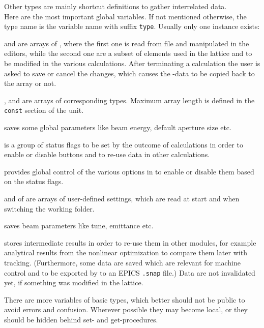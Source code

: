 \documentclass[12pt]{article}
\newcommand\code[1]{{\tt #1}}
\newcommand{\unico}[1]{{\color{burntorange}\code{#1}}}
\newcommand{\opagui}[1]{\colorbox{blue!20}{{\color{black}\code{#1}}}}
\newcommand{\ogui}[1]{\hyperref[#1]{\opagui{#1}}}
\newcommand{\todo}[1]{{\color{red} #1}}
\begin{document}
{Other types are mainly shortcut definitions to gather interrelated data.\\

Here are the most important global variables. If not mentioned otherwise, the type name is the variable name with suffix \code{type}. Usually only one instance exists:

\unico{Elem} and \unico{Ella} are arrays of \unico{Elementtype}, where the first one is read from file and manipulated in the editors, while the second one are a subset of elements used in the lattice and to be modified in the various calculations. After terminating a calculation the user is asked to save or cancel the changes, which causes the \unico{Ella}-data to be copied back to the \unico{Elem} array or not.

\unico{Segm}, \unico{Lattice} and \unico{Girder} are arrays of corresponding types. Maximum array length is defined in the \code{const} section of the unit.

\unico{Glob} saves some global parameters like beam energy, default aperture size etc.

\unico{Status} is a group of status flags to be set by the outcome of calculations in order to enable or disable buttons and to re-use data in other calculations.

\unico{MainButtonHandles} provides global control of the various options in \ogui{opamenu} to enable or disable them based on the status flags.

\unico{GlobDef} and \unico{Def} of \unico{DefaultType} are arrays of user-defined settings, which are read at start and when switching the working folder. 

\unico{Beam} saves beam parameters like tune, emittance etc.

\unico{SnapSave} stores intermediate results in order to re-use them in other modules, for example analytical results from the nonlinear optimization to compare them later with tracking. (Furthermore, some data are saved which are relevant for machine control and to be exported by \ogui{opacurrents} to an EPICS \code{.snap} file.) \todo{Data are not invalidated yet, if something was modified in the lattice.}

\todo{There are more variables of basic types, which better should not be public to avoid errors and confusion. Wherever possible they may become local, or they should be hidden behind set- and get-procedures.}

}
\end{document}
